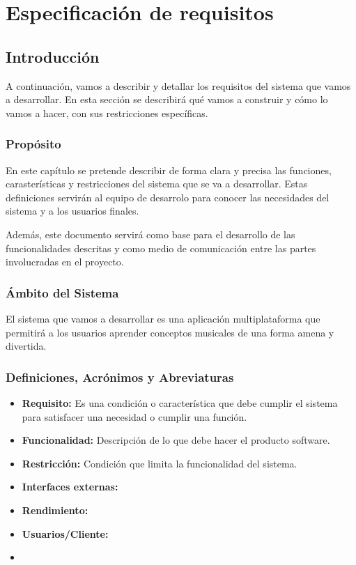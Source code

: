 \chapter{Especificación de requisitos}


\section{Introducción}
A continuación, vamos a describir y detallar los requisitos del sistema 
que vamos a desarrollar. En esta sección se describirá qué vamos a construir y cómo lo vamos
a hacer, con sus restricciones específicas.

\subsection{Propósito}
En este capítulo se pretende describir de forma clara y precisa las funciones, carasterísticas y restricciones 
del sistema que se va a desarrollar. Estas definiciones servirán al equipo de desarrolo para 
conocer las necesidades del sistema y a los usuarios finales. 

Además, este documento servirá como base para el desarrollo de las funcionalidades descritas y como medio de comunicación 
entre las partes involucradas en el proyecto.
\subsection{Ámbito del Sistema}
El sistema que vamos a desarrollar es una aplicación multiplataforma que permitirá a los usuarios
aprender conceptos musicales de una forma amena y divertida.

\subsection{Definiciones, Acrónimos y Abreviaturas}

\begin{itemize}
    \item \textbf{Requisito:} Es una condición o característica que debe cumplir el sistema para satisfacer una necesidad o cumplir una función.
    \item \textbf{Funcionalidad:} Descripción de lo que debe hacer el producto software.
    \item \textbf{Restricción:} Condición que limita la funcionalidad del sistema.
    \item \textbf{Interfaces externas:} 
    \item \textbf{Rendimiento: }
    \item \textbf{Usuarios/Cliente: }
    \item \textbf{}
\end{itemize}

